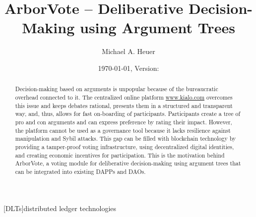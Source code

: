 \documentclass[%
aip,
amsmath,amssymb,
reprint,%
unsortedaddress,
nofootinbib
]{revtex4-2}
\begin{document}
\title{ArborVote -- Deliberative Decision-Making using Argument Trees }
\author{Michael A. Heuer}
\date{\today, Version: \gitDescribe}

\begin{abstract}
Decision-making based on arguments is unpopular because of the bureaucratic overhead connected to it. 
The centralized online platform \href{https://www.kialo.com/}{www.kialo.com} overcomes this issue and 
	keeps debates rational, 
	presents them in a structured and transparent way, and, thus,
	allows for fast on-boarding of participants.
Participants create a tree of pro and con arguments and can express preference by rating their impact. 
However, the platform cannot be used as a governance tool because it lacks resilience against manipulation and Sybil attacks.
This gap can be filled with blockchain technology by
	providing a tamper-proof voting infrastructure,
	using decentralized digital identities, and
	creating economic incentives for participation.
This is the motivation behind ArborVote, a voting module for deliberative decision-making using argument trees that can be integrated into existing \aclp{DAPP} and \aclp{DAO}.
\end{abstract}


\maketitle

\setlength{\parindent}{0cm}
\setlength{\parskip}{0.4em plus0.1em minus0.1em}

\begin{acronym}
	[DLTs]{distributed ledger technologies}
\end{acronym}


\end{document}
